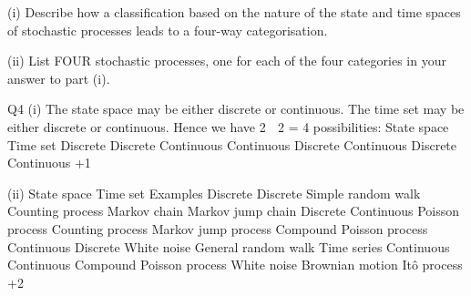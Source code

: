 \documentclass[a4paper,12pt]{article}
\begin{document}
(i) Describe how a classification based on the nature of the state and time spaces
of stochastic processes leads to a four-way categorisation.

(ii) List FOUR stochastic processes, one for each of the four categories in your
answer to part (i).


\newpage
Q4
(i)
The state space may be either discrete or continuous. 
The time set may be either discrete or continuous. 
Hence we have 2  2 = 4 possibilities:
State space Time set
Discrete
Discrete
Continuous
Continuous Discrete
Continuous
Discrete
Continuous
+1

(ii)
State space Time set Examples
Discrete Discrete Simple random walk
Counting process
Markov chain
Markov jump chain
Discrete Continuous Poisson process
Counting process
Markov jump process
Compound Poisson
process
Continuous Discrete White noise
General random walk
Time series
Continuous Continuous Compound Poisson
process
White noise
Brownian motion
Itô process
+2

\end{document}
